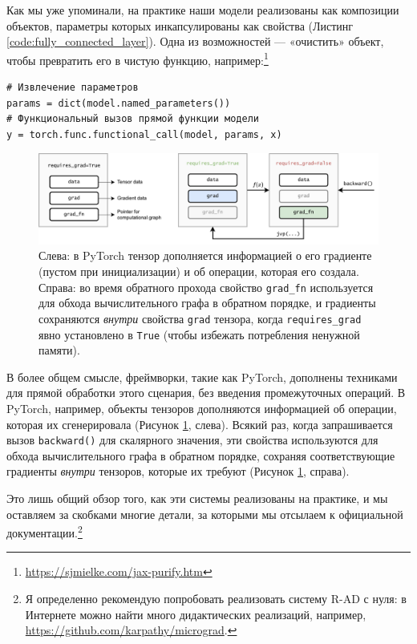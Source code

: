Как мы уже упоминали, на практике наши модели реализованы как композиции объектов, параметры которых инкапсулированы как свойства (Листинг \ref{code:fully_connected_layer}). Одна из возможностей — «очистить» объект, чтобы превратить его в чистую функцию, например:\footnote{\url{https://sjmielke.com/jax-purify.htm}}

{\footnotesize
\begin{verbatim}
# Извлечение параметров
params = dict(model.named_parameters())
# Функциональный вызов прямой функции модели
y = torch.func.functional_call(model, params, x)
\end{verbatim}
}

\begin{figure}
    \centering
    \includegraphics[width=\textwidth]{images/pytorch_wrapper-Pagina-2}
    \caption{Слева: в PyTorch тензор дополняется информацией о его градиенте (пустом при инициализации) и об операции, которая его создала. Справа: во время обратного прохода свойство {\footnotesize\texttt{grad_fn}} используется для обхода вычислительного графа в обратном порядке, и градиенты сохраняются \textit{внутри} свойства {\footnotesize\texttt{grad}} тензора, когда {\footnotesize\texttt{requires_grad}} явно установлено в {\footnotesize\texttt{True}} (чтобы избежать потребления ненужной памяти).}
    \label{fig:pytorch_wrapper}
\end{figure}

В более общем смысле, фреймворки, такие как PyTorch, дополнены техниками для прямой обработки этого сценария, без введения промежуточных операций. В PyTorch, например, объекты тензоров дополняются информацией об операции, которая их сгенерировала (Рисунок \ref{fig:pytorch_wrapper}, слева). Всякий раз, когда запрашивается вызов {\footnotesize\texttt{backward()}} для скалярного значения, эти свойства используются для обхода вычислительного графа в обратном порядке, сохраняя соответствующие градиенты \textit{внутри} тензоров, которые их требуют (Рисунок \ref{fig:pytorch_wrapper}, справа). 

Это лишь общий обзор того, как эти системы реализованы на практике, и мы оставляем за скобками многие детали, за которыми мы отсылаем к официальной документации.\footnote{Я определенно рекомендую попробовать реализовать систему R-AD с нуля: в Интернете можно найти много дидактических реализаций, например, \url{https://github.com/karpathy/micrograd}.}

